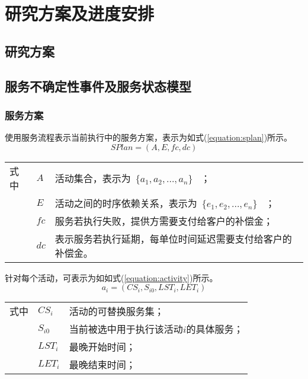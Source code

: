 \section{研究方案及进度安排}

\subsection{研究方案}

\subsection{服务不确定性事件及服务状态模型}

\subsubsection{服务方案}

使用服务流程表示当前执行中的服务方案，表示为如式(\ref{equation:splan})所示。
\begin{equation}\label{equation:splan}
SPlan = \left( {A,E,fc,dc} \right)
\end{equation}
\begin{tabularx}{\textwidth}{@{}l@{\quad}l@{\pozhehao }X@{}}
    式中
    & ${A}$ & 活动集合，表示为~$\{{a_1}, {a_2},...,{a_n}\}$ ~； \\
    & ${E}$ & 活动之间的时序依赖关系，表示为~$\{{e_1}, {e_2},...,{e_n}\}$ ~；\\
    & ${fc}$ & 服务若执行失败，提供方需要支付给客户的补偿金；\\
    & ${dc}$ & 表示服务若执行延期，每单位时间延迟需要支付给客户的补偿金。
\end{tabularx}\vspace{\wordsep}

针对每个活动，可表示为如如式(\ref{equation:activity})所示。
\begin{equation}\label{equation:activity}
{a_i} = ({CS_i}, {S_{i0}}, {LST_i}, {LET_i})
\end{equation}
\begin{tabularx}{\textwidth}{@{}l@{\quad}l@{\pozhehao }X@{}}
    式中
    & ${CS_i}$ & 活动的可替换服务集；\\
    & ${S_{i0}}$ & 当前被选中用于执行该活动$i$的具体服务；\\
    & ${LST_i}$ & 最晚开始时间；\\
    & ${LET_i}$ & 最晚结束时间；
\end{tabularx}\vspace{\wordsep}

